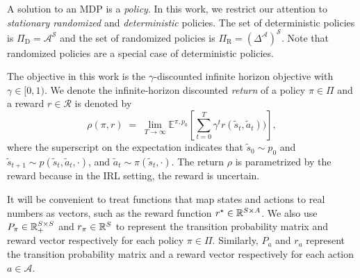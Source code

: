 \documentclass[10pt]{article}
\theoremstyle{plain}
\theoremstyle{remark}
\begin{document}
A solution to an MDP is a \emph{policy}. In this work, we restrict our attention to \emph{stationary randomized} and \emph{deterministic} policies. The set of deterministic policies is $\Pi_{\mathrm{D}}= \mathcal{A}^{\mathcal{S}}$ and the set of randomized policies is $\Pi_{\mathrm{R}} = {\left(\Delta^{\mathcal{A}}\right)}^{\mathcal{S}}$. Note that randomized policies are a special case of deterministic policies. 



The objective in this work is the $\gamma$-discounted infinite horizon objective with $\gamma \in [0,1)$. We denote the  infinite-horizon discounted \emph{return} of a policy $\pi \in \Pi$ and a reward $r \in \mathcal{R}$ is denoted by 
\[
  \rho(\pi, r)
  \;=\; \lim_{T\to\infty} \mathbb{E}^{\pi, p_0} \left[   \sum_{t=0}^{T} \gamma^t r(\tilde{s}_t,\tilde{a}_t)) \right], 
\]
where the superscript on the expectation indicates that $\tilde{s}_0 \sim p_0$ and $\tilde{s}_{t+1} \sim p(\tilde{s}_t,\tilde{a}_t, \cdot)$, and $\tilde{a}_t \sim \pi(\tilde{s}_t, \cdot )$.  The return $\rho$ is parametrized by the reward because in the IRL setting, the reward is uncertain. 


It will be convenient to treat functions that map states and actions to real numbers as vectors, such as the reward function $r^{\mathnormal{\star}} \in \mathbb{R}^{S \times  A}$. We also use $P_{\pi} \in \mathbb{R}_+^{S \times S}$ and $r_{\pi}\in \mathbb{R}^S$  to represent the transition probability matrix and reward vector respectively for each policy $\pi\in \Pi$. Similarly, $P_a$ and $r_a$ represent the transition probability matrix and a reward vector respectively for each action $a\in \mathcal{A}$.
\end{document}
